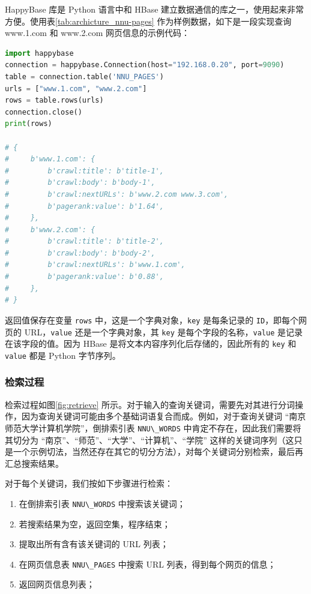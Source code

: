 \documentclass{ctexart}
\newcommand{\code}[1]{\colorbox{backcolor}{\lstinline|#1|}}
\begin{document}
    HappyBase 库是 Python 语言中和 HBase 建立数据通信的库之一，使用起来非常方便。使用表\ref{tab:archicture_nnu-pages} 作为样例数据，如下是一段实现查询 www.1.com 和 www.2.com 网页信息的示例代码：

    \begin{lstlisting}[language=Python]
import happybase
connection = happybase.Connection(host="192.168.0.20", port=9090)
table = connection.table('NNU_PAGES')
urls = ["www.1.com", "www.2.com"]
rows = table.rows(urls)
connection.close()
print(rows)

# {
#     b'www.1.com': {
#         b'crawl:title': b'title-1',
#         b'crawl:body': b'body-1',
#         b'crawl:nextURLs': b'www.2.com www.3.com',
#         b'pagerank:value': b'1.64',
#     },
#     b'www.2.com': {
#         b'crawl:title': b'title-2',
#         b'crawl:body': b'body-2',
#         b'crawl:nextURLs': b'www.1.com',
#         b'pagerank:value': b'0.88',
#     },
# }
    \end{lstlisting}

    返回值保存在变量 \code{rows} 中，这是一个字典对象，\code{key} 是每条记录的 \code{ID}，即每个网页的 URL，\code{value} 还是一个字典对象，其 \code{key} 是每个字段的名称，\code{value} 是记录在该字段的值。因为 HBase 是将文本内容序列化后存储的，因此所有的 \code{key} 和 \code{value} 都是 Python 字节序列。

    \subsubsection{检索过程}\label{subsubsec:retrieve_run}

    检索过程如图\ref{fig:retrieve} 所示。对于输入的查询关键词，需要先对其进行分词操作，因为查询关键词可能由多个基础词语复合而成。例如，对于查询关键词 “南京师范大学计算机学院”，倒排索引表 \code{NNU\_WORDS} 中肯定不存在，因此我们需要将其切分为 “南京”、“师范”、“大学”、“计算机”、“学院” 这样的关键词序列（这只是一个示例切法，当然还存在其它的切分方法），对每个关键词分别检索，最后再汇总搜索结果。

    对于每个关键词，我们按如下步骤进行检索：

    \begin{enumerate}
        \item 在倒排索引表 \code{NNU\_WORDS} 中搜索该关键词；
        \item 若搜索结果为空，返回空集，程序结束；
        \item 提取出所有含有该关键词的 URL 列表；
        \item 在网页信息表 \code{NNU\_PAGES} 中搜索 URL 列表，得到每个网页的信息；
        \item 返回网页信息列表；
    \end{enumerate}
\end{document}
